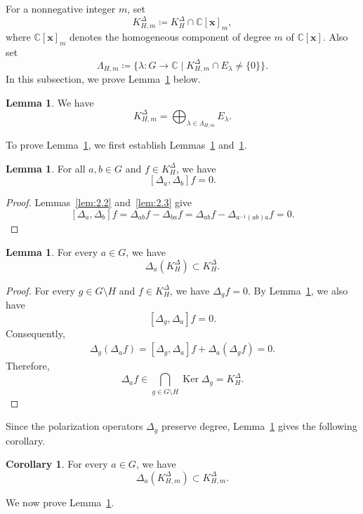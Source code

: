 \documentclass[12pt,a4paper]{article}
\theoremstyle{definition}
\newtheorem{lem}[definition]{Lemma}
\newtheorem{cor}[definition]{Corollary}
\numberwithin{definition}{section}
\DeclareMathOperator{\Ker}{Ker}
\begin{document}
For a nonnegative integer $m$, set
\[
K_{H, m}^{\Delta} \coloneqq K_{H}^{\Delta} \cap \mathbb{C}[\bm{x}]_{m},
\]
where $\mathbb C[\bm x]_m$ denotes the homogeneous component
of degree $m$ of $\mathbb C[\bm x]$.
Also set
\[
\Lambda_{H, m} \coloneqq \{ \lambda \colon G \to \mathbb{C} \mid K_{H, m}^{\Delta} \cap E_{\lambda} \neq \{ 0 \} \}.
\]
In this subsection, we prove Lemma~\ref{lem:2.11} below.

\begin{lem}\label{lem:2.11}
We have
\[
K_{H, m}^{\Delta} = \bigoplus_{\lambda \in \Lambda_{H, m}} E_{\lambda}.
\]
\end{lem}

To prove Lemma~\ref{lem:2.11}, we first establish
Lemmas~\ref{lem:2.12} and~\ref{lem:2.13}.

\begin{lem}\label{lem:2.12}
For all $a,b\in G$ and $f\in K_H^\Delta$, we have
\[
 [\Delta_a,\Delta_b]f=0.
\]
\end{lem}
\begin{proof}
Lemmas~\ref{lem:2.2} and~\ref{lem:2.3} give
\[
[\Delta_{a}, \Delta_{b}] f
= \Delta_{a b} f - \Delta_{b a} f
= \Delta_{a b} f - \Delta_{a^{-1} (a b) a} f
= 0.
\]
\end{proof}

\begin{lem}\label{lem:2.13}
For every $a\in G$, we have
\[
 \Delta_a(K_H^\Delta)\subset K_H^\Delta.
\]
\end{lem}
\begin{proof}
For every $g\in G\setminus H$ and $f\in K_H^\Delta$, we have $\Delta_gf=0$.
By Lemma~\ref{lem:2.12}, we also have
\[
 [\Delta_g, \Delta_a]f = 0.
\]
Consequently,
\[
 \begin{aligned}
 \Delta_g(\Delta_af)
 =
 [\Delta_g,\Delta_a]f+\Delta_a(\Delta_gf)
 =0.
 \end{aligned}
\]
Therefore,
\[
 \Delta_af\in
 \bigcap_{g\in G\setminus H}\Ker\Delta_g
 = K_H^\Delta.
\]
\end{proof}

Since the polarization operators $\Delta_g$ preserve degree,
Lemma~\ref{lem:2.13} gives the following corollary.

\begin{cor}\label{cor:2.14}
For every $a\in G$, we have
\[
\Delta_a(K_{H, m}^\Delta)\subset K_{H, m}^\Delta.
\]
\end{cor}

We now prove Lemma~\ref{lem:2.11}.
\end{document}
